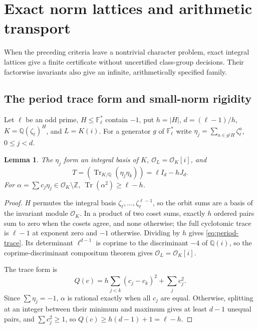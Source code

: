 \documentclass[11pt]{article}
\newtheorem{lemma}[theorem]{Lemma}
\theoremstyle{definition}
\theoremstyle{remark}
\begin{document}
\section{Exact norm lattices and arithmetic transport}\label{sec:catalogs}
When the preceding criteria leave a nontrivial character problem, exact
integral lattices give a finite certificate without uncertified class-group
decisions. Their factorwise invariants also give an infinite, arithmetically
specified family.

\subsection{The period trace form and small-norm rigidity}
Let $\ell$ be an odd prime, $H\le\mathbb F_\ell^*$ contain $-1$, put
$h=|H|$, $d=(\ell-1)/h$, $K=\mathbb Q(\zeta_\ell)^H$, and $L=K(i)$.
For a generator $g$ of $\mathbb F_\ell^*$ write
$\eta_j=\sum_{a\in g^jH}\zeta_\ell^a$, $0\le j<d$.
\begin{lemma}\label{lem:period-trace}
The $\eta_j$ form an integral basis of $K$, $\mathcal O_L=\mathcal O_K[i]$,
and
\begin{equation}\label{eq:period-trace}
 T=(\operatorname{Tr}_{K/\mathbb Q}(\eta_j\eta_k))
   =\ell I_d-hJ_d.
\end{equation}
For $\alpha=\sum c_j\eta_j\in\mathcal O_K\setminus\mathbb Z$,
$\operatorname{Tr}(\alpha^2)\ge\ell-h$.
\end{lemma}
\begin{proof}
$H$ permutes the integral basis $\zeta_\ell,\ldots,\zeta_\ell^{\ell-1}$, so
the orbit sums are a basis of the invariant module $\mathcal O_K$. In a
product of two coset sums, exactly $h$ ordered pairs sum to zero when the
cosets agree, and none otherwise; the full cyclotomic trace is $\ell-1$ at
exponent zero and $-1$ otherwise. Dividing by $h$ gives
\eqref{eq:period-trace}. Its determinant $\ell^{d-1}$ is coprime to the
discriminant $-4$ of $\mathbb Q(i)$, so the coprime-discriminant compositum
theorem gives $\mathcal O_L=\mathcal O_K[i]$.

The trace form is
\[
 Q(c)=h\sum_{j<k}(c_j-c_k)^2+\sum_jc_j^2.
\]
Since $\sum\eta_j=-1$, $\alpha$ is rational exactly when all $c_j$ are
equal. Otherwise, splitting at an integer between their minimum and
maximum gives at least $d-1$ unequal pairs, and $\sum c_j^2\ge1$, so
$Q(c)\ge h(d-1)+1=\ell-h$.
\end{proof}
\end{document}
